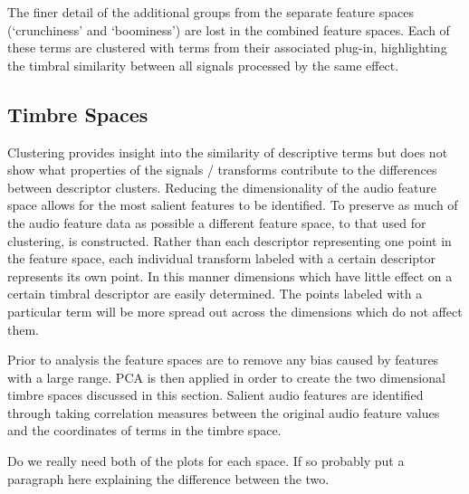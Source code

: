 		The finer detail of the additional groups from the separate feature spaces (`crunchiness' and `boominess')
		are lost in the combined feature spaces. Each of these terms are clustered with terms from their associated
		plug-in, highlighting the timbral similarity between all signals processed by the same effect.

	\subsection{Timbre Spaces}
	\label{sec:TimbreEvaluation-Analysis-TimbreSpaces}
		Clustering provides insight into the similarity of descriptive terms but does not show what properties of
		the signals / transforms contribute to the differences between descriptor clusters. Reducing the
		dimensionality of the audio feature space allows for the most salient features to be identified. To preserve
		as much of the audio feature data as possible a different feature space, to that used for clustering, is
		constructed. Rather than each descriptor representing one point in the feature space, each individual
		transform labeled with a certain descriptor represents its own point. In this manner dimensions which have
		little effect on a certain timbral descriptor are easily determined. The points labeled with a particular
		term will be more spread out across the dimensions which do not affect them. 
		
		Prior to analysis the feature spaces are to remove any bias caused by features with a large range. PCA is
		then applied in order to create the two dimensional timbre spaces discussed in this section.  Salient audio
		features are identified through taking correlation measures between the original audio feature values and
		the coordinates of terms in the timbre space.

		\note
		{
			Do we really need both of the plots for each space. If so probably put a paragraph here explaining
			the difference between the two.
		}

